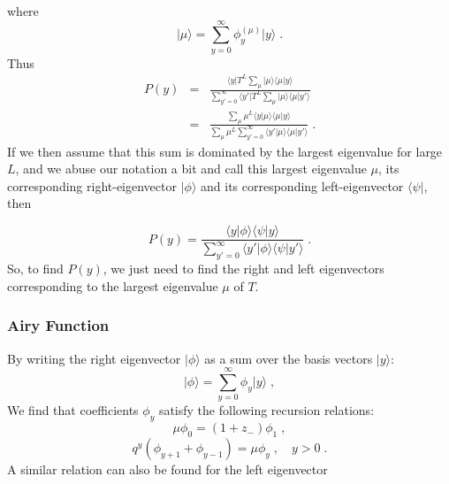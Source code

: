 \documentclass[a4paper,10pt]{article}
\newcommand{\bra}[1]{\langle #1 \vert}
\newcommand{\ket}[1]{\vert #1 \rangle}
\newcommand{\braket}[2]{\langle #1 \vert #2 \rangle}
\newcommand{\py}{P(y)}
\begin{document}
where
\begin{equation}
  \ket{\mu} = \sum_{y=0}^\infty \phi^{(\mu)}_y \ket{y} \;.
\end{equation}
Thus
\begin{eqnarray}
  \py &  = & \frac{\bra{y} T^L \sum_\mu \ket{\mu} \braket{\mu}{y}}{\sum_{y'=0}^\infty \bra{y'} T^L \sum_\mu \ket{\mu} \braket{\mu}{y'}} \nonumber \\
      &  = & \frac{ \sum_\mu \mu^L \braket{y}{\mu} \braket{\mu}{y}}{\sum_\mu \mu^L \sum_{y'=0}^\infty \braket{y'}{\mu} \braket{\mu}{y'}}\;.
\end{eqnarray}
If we then assume that this sum is dominated by the largest eigenvalue for large $L$, and we abuse our notation a bit and call this largest eigenvalue $\mu$, its corresponding right-eigenvector $\ket{\phi}$ and its corresponding left-eigenvector $\bra{\psi}$, then 

\begin{equation}
  \py  =  \frac{ \braket{y}{\phi} \braket{\psi}{y}}{\sum_{y'=0}^\infty \braket{y'}{\phi} \braket{\psi}{y'}}  \;.
\end{equation}
So, to find $\py$, we just need to find the right and left eigenvectors corresponding to the largest eigenvalue $\mu$ of $T$.

\subsubsection{Airy Function}

By writing the right eigenvector $\ket{\phi}$ as a sum over the basis vectors $\ket{y}$:
\begin{equation}\label{eq:phi_basis}
  \ket{\phi} = \sum_{y=0}^\infty \phi_y \ket{y} \;,
\end{equation}
We find that  coefficients $\phi_y$ satisfy the following recursion relations:
\begin{equation}\label{eq:recursion01}
  \mu \phi_0 = (1+z_-)\phi_1 \;,
\end{equation}
\begin{equation}\label{eq:recursion}
  q^y (\phi_{y+1} + \phi_{y-1}) = \mu \phi_y \;, \quad y>0 \;.
\end{equation}
A similar relation can also be found for the left eigenvector
\end{document}
